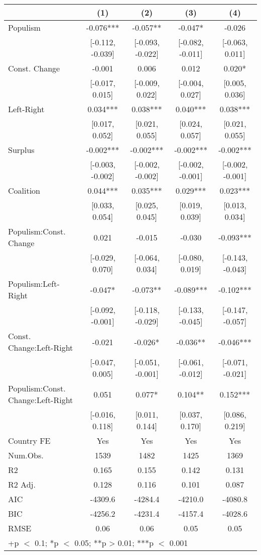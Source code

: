 \begin{table}
\centering\centering\centering
\begin{tabular}[t]{lcccc}
\toprule
  & (1) & (2) & (3) & (4)\\
\midrule
Populism & -0.076*** & -0.057** & -0.047* & -0.026\\
 & {}[-0.112, -0.039] & {}[-0.093, -0.022] & {}[-0.082, -0.011] & {}[-0.063, 0.011]\\
Const. Change & -0.001 & 0.006 & 0.012 & 0.020*\\
 & {}[-0.017, 0.015] & {}[-0.009, 0.022] & {}[-0.004, 0.027] & {}[0.005, 0.036]\\
Left-Right & 0.034*** & 0.038*** & 0.040*** & 0.038***\\
 & {}[0.017, 0.052] & {}[0.021, 0.055] & {}[0.024, 0.057] & {}[0.021, 0.055]\\
Surplus & -0.002*** & -0.002*** & -0.002*** & -0.002***\\
 & {}[-0.003, -0.002] & {}[-0.002, -0.002] & {}[-0.002, -0.001] & {}[-0.002, -0.001]\\
Coalition & 0.044*** & 0.035*** & 0.029*** & 0.023***\\
 & {}[0.033, 0.054] & {}[0.025, 0.045] & {}[0.019, 0.039] & {}[0.013, 0.034]\\
Populism:Const. Change & 0.021 & -0.015 & -0.030 & -0.093***\\
 & {}[-0.029, 0.070] & {}[-0.064, 0.034] & {}[-0.080, 0.019] & {}[-0.143, -0.043]\\
Populism:Left-Right & -0.047* & -0.073** & -0.089*** & -0.102***\\
 & {}[-0.092, -0.001] & {}[-0.118, -0.029] & {}[-0.133, -0.045] & {}[-0.147, -0.057]\\
Const. Change:Left-Right & -0.021 & -0.026* & -0.036** & -0.046***\\
 & {}[-0.047, 0.005] & {}[-0.051, -0.001] & {}[-0.061, -0.012] & {}[-0.071, -0.021]\\
Populism:Const. Change:Left-Right & 0.051 & 0.077* & 0.104** & 0.152***\\
 & {}[-0.016, 0.118] & {}[0.011, 0.144] & {}[0.037, 0.170] & {}[0.086, 0.219]\\
\midrule
Country FE & Yes & Yes & Yes & Yes\\
Num.Obs. & 1539 & 1482 & 1425 & 1369\\
R2 & 0.165 & 0.155 & 0.142 & 0.131\\
R2 Adj. & 0.128 & 0.116 & 0.101 & 0.087\\
AIC & -4309.6 & -4284.4 & -4210.0 & -4080.8\\
BIC & -4256.2 & -4231.4 & -4157.4 & -4028.6\\
RMSE & 0.06 & 0.06 & 0.05 & 0.05\\
\bottomrule
\multicolumn{5}{l}{\rule{0pt}{1em}+p $<$ 0.1; *p $<$ 0.05; **p > 0.01; ***p $<$ 0.001}\\
\end{tabular}
\end{table}
